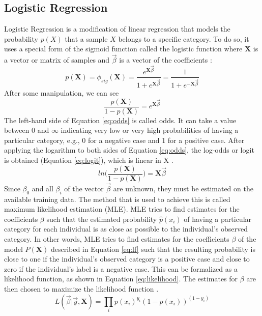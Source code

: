 \subsection{Logistic Regression}
Logistic Regression is a modification of linear regression that models the 
probability $p(X)$ that a sample $X$ belongs to a specific category. To do so, 
it uses a special form of the sigmoid function called the logistic function 
where $\mathbf{X}$ is a vector or matrix of samples and $\vec{\beta}$ is a 
vector of the coefficients \cite{RN170, RN166}:
\begin{equation}
 p(\mathbf{X}) = \phi_{sig}(\mathbf{X}) = 
\frac{e^{\mathbf{X}\vec{\beta}}}{1+e^{\mathbf{X}\vec{\beta}}} = 
\frac{1}{1+e^{-\mathbf{X}\vec{\beta}}}
 \label{eq:lf}
\end{equation}
After some manipulation, we can see
\begin{equation}
 \frac{p(\mathbf{X})}{1-p(\mathbf{X})} = e^{\mathbf{X}\vec{\beta}}
 \label{eq:odds}
\end{equation}
The left-hand side of Equation \ref{eq:odds} is called odds. It can take a 
value between 0 and $\infty$ indicating very low or very high probabilities 
of having a particular category, e.g., 0 for a negative case and 1 for a 
positive case.
After applying the logarithm to both sides of Equation \ref{eq:odds}, the 
log-odds or logit is obtained (Equation \ref{eq:logit}), which is linear in X 
\cite{RN174, RN166}.
\begin{equation}
 ln \Big( \frac{p(\mathbf{X})}{1-p(\mathbf{X})} \Big) = \mathbf{X}\vec{\beta}
 \label{eq:logit}
\end{equation}
Since $\beta_0$ and all $\beta_i$ of the vector $\vec{\beta}$ are unknown, 
they must be estimated on the 
available training data. The method that is used to achieve this is called 
maximum likelihood estimation (MLE). MLE tries to find estimates for the 
coefficients $\beta$ such that the estimated probability $\hat{p}(x_i)$ of 
having a particular category for each individual is as close as possible to 
the individual's observed category. In other words, MLE tries to find estimates 
for the coefficients $\beta$ of the model $P(\mathbf{X})$ described in Equation 
\ref{eq:lf} such that the resulting probability is close to one if the 
individual's observed category is a positive case and close to zero if the 
individual's label is a negative case. This can be formalized as a likelihood 
function, as shown in Equation \ref{eq:likelihood}. The estimates for $\beta$ 
are then chosen to maximize the likelihood function \cite{RN166}.
\begin{equation}
 L(\vec{\beta}|\vec{y}, \mathbf{X}) = \prod_{i} p(x_i)^{y_i} 
(1-p(x_i))^{(1-y_i)}
\label{eq:likelihood}
\end{equation}
